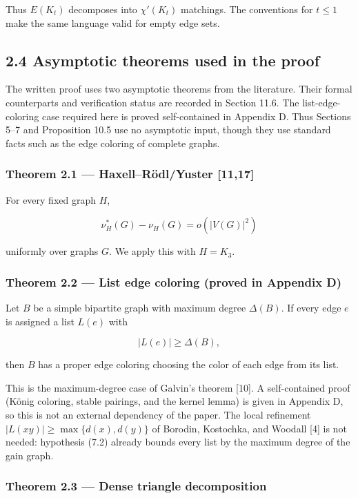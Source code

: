 \documentclass[
  american,
  11pt,
  a4paper,
]{article}
\begin{document}
Thus \(E(K_t)\) decomposes into \(\chi'(K_t)\) matchings. The conventions for \(t\le1\) make the same language valid for empty edge sets.

\subsection{2.4 Asymptotic theorems used in the proof}\label{asymptotic-theorems-used-in-the-proof}

The written proof uses two asymptotic theorems from the literature. Their formal counterparts and verification status are recorded in Section 11.6. The list-edge-coloring case required here is proved self-contained in Appendix D. Thus Sections 5--7 and Proposition 10.5 use no asymptotic input, though they use standard facts such as the edge coloring of complete graphs.

\subsubsection{Theorem 2.1 --- Haxell--Rödl/Yuster {[}11,17{]}}\label{theorem-2.1-haxellruxf6dlyuster-1117}

For every fixed graph \(H\),

\[
\nu_H^*(G)-\nu_H(G)=o(|V(G)|^2)
\]

uniformly over graphs \(G\). We apply this with \(H=K_3\).

\subsubsection{Theorem 2.2 --- List edge coloring (proved in Appendix D)}\label{theorem-2.2-list-edge-coloring-proved-in-appendix-d}

Let \(B\) be a simple bipartite graph with maximum degree \(\Delta(B)\). If every edge \(e\) is assigned a list \(L(e)\) with

\[
|L(e)|\ge\Delta(B),
\]

then \(B\) has a proper edge coloring choosing the color of each edge from its list.

This is the maximum-degree case of Galvin's theorem {[}10{]}. A self-contained proof (König coloring, stable pairings, and the kernel lemma) is given in Appendix D, so this is not an external dependency of the paper. The local refinement \(|L(xy)|\ge\max\{d(x),d(y)\}\) of Borodin, Kostochka, and Woodall {[}4{]} is not needed: hypothesis (7.2) already bounds every list by the maximum degree of the gain graph.

\subsubsection{Theorem 2.3 --- Dense triangle decomposition}\label{theorem-2.3-dense-triangle-decomposition}
\end{document}
